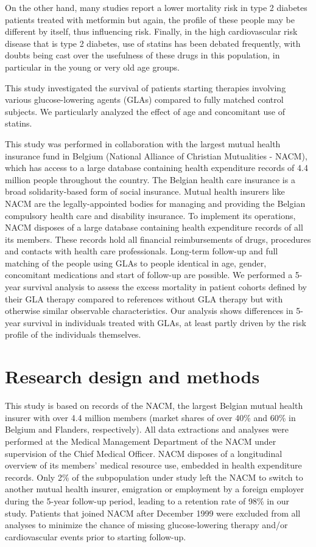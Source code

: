 On the other hand, many studies report a lower mortality risk in type 2 diabetes patients treated with metformin \citep{s3,s4,s5,s6,s7,s8,s9} but again, the profile of these people may be different by itself, thus influencing risk. Finally, in the high cardiovascular risk disease that is type 2 diabetes, use of statins has been debated frequently, with doubts being cast over the usefulness of these drugs in this population, in particular in the young or very old age groups. 

This study investigated the survival of patients starting therapies involving various glucose-lowering agents (GLAs) compared to fully matched control subjects. We particularly analyzed the effect of age and concomitant use of statins.

This study was performed in collaboration with the largest mutual health insurance fund in Belgium (National Alliance of Christian Mutualities - NACM), which has access to a large database containing health expenditure records of 4.4 million people throughout the country. The Belgian health care insurance is a broad solidarity-based form of social insurance. Mutual health insurers like NACM are the legally-appointed bodies for managing and providing the Belgian compulsory health care and disability insurance. To implement its operations, NACM disposes of a large database containing health expenditure records of all its members. These records hold all financial reimbursements of drugs, procedures and contacts with health care professionals. Long-term follow-up and full matching of the people using GLAs to people identical in age, gender, concomitant medications and start of follow-up are possible. We performed a 5-year survival analysis to assess the excess mortality in patient cohorts defined by their GLA therapy compared to references without GLA therapy but with otherwise similar observable characteristics. Our analysis shows differences in 5-year survival in individuals treated with GLAs, at least partly driven by the risk profile of the individuals themselves. 

\section{Research design and methods}

This study is based on records of the NACM, the largest Belgian mutual health insurer with over 4.4 million members (market shares of over 40\% and 60\% in Belgium and Flanders, respectively). All data extractions and analyses were performed at the Medical Management Department of the NACM under supervision of the Chief Medical Officer.
NACM disposes of a longitudinal overview of its members' medical resource use, embedded in health expenditure records. Only 2\% of the subpopulation under study left the NACM to switch to another mutual health insurer, emigration or employment by a foreign employer during the 5-year follow-up period, leading to a retention rate of 98\% in our study. Patients that joined NACM after December 1999 were excluded from all analyses to minimize the chance of missing glucose-lowering therapy and/or cardiovascular events prior to starting follow-up.

